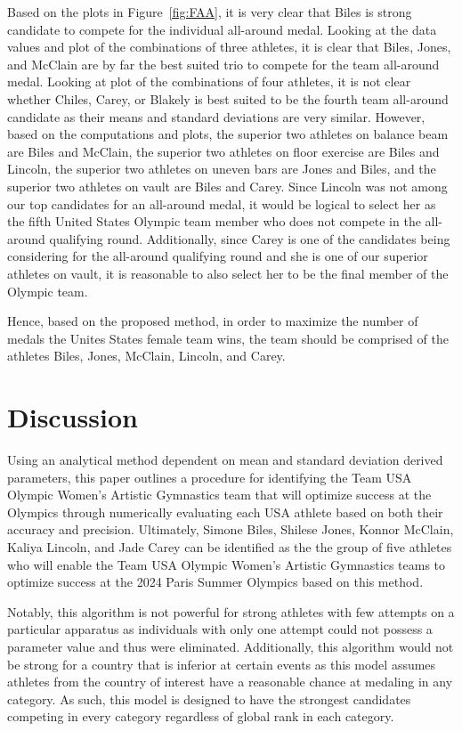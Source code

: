 \documentclass[12pt]{article}
\begin{document}
Based on the plots in Figure~\ref{fig:FAA}, it is very clear that Biles is strong candidate to 
compete for the individual all-around medal. Looking at the data values and plot of the combinations of three athletes, 
it is clear that Biles, Jones, and McClain are by far the best suited trio to compete for the team all-around medal. 
Looking at plot of the combinations of four athletes, it is not clear whether Chiles, Carey, or 
Blakely is best suited to be the fourth team all-around candidate as their means and standard deviations are very 
similar. However, based on the computations and plots, the superior two 
athletes on balance beam are Biles and McClain, the superior two athletes on floor exercise are Biles and Lincoln, 
the superior two athletes on uneven bars are Jones and Biles, and the superior two athletes on vault are Biles 
and Carey. Since Lincoln was not among our top candidates for an all-around medal, it would be logical to select her 
as the fifth United States Olympic team member who does not compete in the all-around qualifying round. Additionally, 
since Carey is one of the candidates being considering for the all-around qualifying round and she is one of our superior 
athletes on vault, it is reasonable to also select her to be the final member of the Olympic team. 

Hence, based on the proposed method, in order to maximize the number of medals the Unites States female team wins, 
the team should be comprised of the athletes Biles, Jones, McClain, Lincoln, and Carey.
 
\section{Discussion}
\label{sec:dis}

Using an analytical method dependent on mean and standard deviation derived parameters, this paper 
outlines a procedure for identifying the Team USA Olympic Women’s Artistic Gymnastics team that will optimize 
success at the Olympics through numerically evaluating each USA athlete based on both their accuracy and precision. 
Ultimately, Simone Biles, Shilese Jones, Konnor McClain, Kaliya Lincoln, and Jade Carey can be identified as the 
the group of five athletes who will enable the Team USA Olympic Women’s Artistic Gymnastics teams to optimize 
success at the 2024 Paris Summer Olympics based on this method.

Notably, this algorithm is not powerful for strong athletes with few attempts on a particular apparatus as individuals 
with only one attempt could not possess a parameter value and thus were eliminated. Additionally, this algorithm 
would not be strong for a country that is inferior at certain events as this model assumes athletes from the country 
of interest have a reasonable chance at medaling in any category. As such, this model is designed to have the strongest 
candidates competing in every category regardless of global rank in each category.
\end{document}
